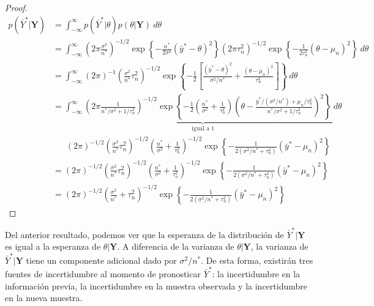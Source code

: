 \documentclass[
  10pt,
  spanish,
]{book}
\theoremstyle{definition}
\theoremstyle{definition}
\theoremstyle{definition}
\theoremstyle{definition}
\theoremstyle{remark}
\begin{document}
\begin{proof}
\iffalse{} {Prueba. } \fi{}\begin{align*}
p(\bar{Y}^*|\mathbf{Y})&=\int_{-\infty}^\infty p(\bar{Y}^*|\theta)p(\theta|\mathbf{Y})\ d\theta\\
&=\int_{-\infty}^\infty (2\pi\frac{\sigma^2}{n^*})^{-1/2}\exp\left\{-\frac{n^*}{2\sigma^2}(\bar{y}^*-\theta)^2\right\}
(2\pi\tau_n^2)^{-1/2}\exp\left\{-\frac{1}{2\tau_n^2}(\theta-\mu_n)^2\right\}\ d\theta\\
&=\int_{-\infty}^\infty (2\pi)^{-1}(\frac{\sigma^2}{n^*}\tau_n^2)^{-1/2}\exp\left\{-\frac{1}{2}\left[\frac{(\bar{y}^*-\theta)^2}{\sigma^2/n^*}+\frac{(\theta-\mu_n)^2}{\tau^2_n}\right]\right\}\ d\theta\\
&=\underbrace{\int_{-\infty}^\infty(2\pi\frac{1}{n^*/\sigma^2+1/\tau^2_n})^{-1/2}\exp\left\{-\frac{1}{2}\left(\frac{n^*}{\sigma^2}+\frac{1}{\tau^2_n}\right)\left(\theta-\frac{\bar{y}^*/(\sigma^2/n^*)+\mu_n/\tau^2_n}{n^*/\sigma^2+1/\tau^2_n}\right)^2\right\}\ d\theta}_{\text{igual a 1}}\\
&\ \ \ \ \ \ \ (2\pi)^{-1/2}(\frac{\sigma^2}{n^*}\tau_n^2)^{-1/2}(\frac{n^*}{\sigma^2}+\frac{1}{\tau^2_n})^{-1/2}\exp\left\{-\frac{1}{2(\sigma^2/n^*+\tau^2_n)}(\bar{y}^*-\mu_n)^2\right\}\\
&=(2\pi)^{-1/2}(\frac{\sigma^2}{n^*}\tau_n^2)^{-1/2}(\frac{n^*}{\sigma^2}+\frac{1}{\tau^2_n})^{-1/2}\exp\left\{-\frac{1}{2(\sigma^2/n^*+\tau^2_n)}(\bar{y}^*-\mu_n)^2\right\}\\
&=(2\pi)^{-1/2}(\frac{\sigma^2}{n^*}+\tau^2_n)^{-1/2}\exp\left\{-\frac{1}{2(\sigma^2/n^*+\tau^2_n)}(\bar{y}^*-\mu_n)^2\right\}
\end{align*}
\end{proof}

Del anterior resultado, podemos ver que la esperanza de la distribución de \(\bar{Y}^*|\mathbf{Y}\) es igual a la esperanza de \(\theta|\mathbf{Y}\). A diferencia de la varianza de \(\theta|\mathbf{Y}\), la varianza de \(\bar{Y}^*|\mathbf{Y}\) tiene un componente adicional dado por \(\sigma^2/n^*\). De esta forma, existirán tres fuentes de incertidumbre al momento de pronosticar \(\bar{Y}^*\): la incertidumbre en la información previa, la incertidumbre en la muestra observada y la incertidumbre en la nueva muestra.
\end{document}
